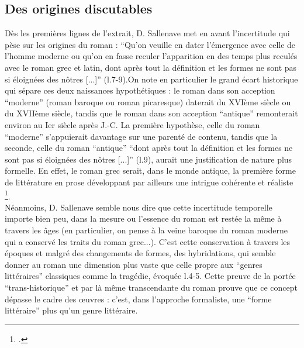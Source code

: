 \documentclass[a4paper,10pt]{article}
\begin{document}
			\subsection{Des origines discutables}
				Dès les premières lignes de l'extrait, D. Sallenave met en avant l'incertitude qui pèse sur les origines du roman : ``Qu'on veuille en dater l'émergence avec celle de l'homme moderne ou qu'on en fasse reculer l'apparition en des temps plus reculés avec le roman grec et latin, dont après tout la définition et les formes ne sont pas si éloignées des nôtres [...]'' (l.7-9).On note en particulier le grand écart historique qui sépare ces deux naissances hypothétiques : le roman dans son acception ``moderne'' (roman baroque ou roman picaresque) daterait du XVIème siècle ou du XVIIème siècle, tandis que le roman dans son acception ``antique'' remonterait environ au Ier siècle après J.-C. La première hypothèse, celle du roman ``moderne'' s'appuierait davantage sur une parenté de contenu, tandis que la seconde, celle du roman ``antique'' ``dont après tout la définition et les formes ne sont pas si éloignées des nôtres [...]'' (l.9), aurait une justification de nature plus formelle.  En effet, le roman grec serait, dans le monde antique, la première forme de littérature en prose développant par ailleurs une intrigue cohérente et réaliste \footcite{WikiRomanGrec}.\\
				Néanmoins, D. Sallenave semble nous dire que cette incertitude temporelle importe bien peu, dans la mesure ou l'essence du roman est restée la même à travers les âges (en particulier, on pense à la veine baroque du roman moderne qui a conservé les traits du roman grec...). C'est cette conservation à travers les époques et malgré des changements de formes, des hybridations, qui semble donner au roman une dimension plus vaste que celle propre aux ``genres littéraires'' classiques comme la tragédie, évoquée l.4-5. Cette preuve de la portée ``trans-historique'' et par là même transcendante du roman prouve que ce concept dépasse le cadre des œuvres : c'est, dans l'approche formaliste, une ``forme littéraire'' plus qu'un genre littéraire.
\end{document}
